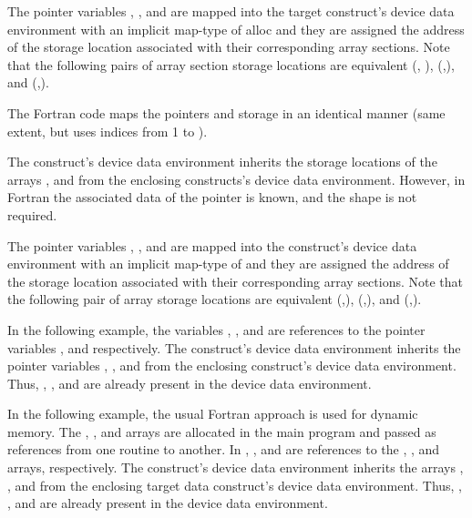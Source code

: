 The pointer variables , , and  are mapped into the target construct's device 
data environment with an implicit map-type of alloc and they are assigned the address 
of the storage location associated with their corresponding array sections. Note 
that the following pairs of array section storage locations are equivalent (, 
), (,), and (,).


The Fortran code maps the pointers and storage in an identical manner (same extent, 
but uses indices from 1 to ).

The  construct's device data environment inherits the storage locations 
of the arrays ,  and  from the enclosing   constructs's 
device data environment. However, in Fortran the associated data of the pointer 
is known, and the shape is not required.

The pointer variables , , and  are mapped into the  construct's 
device data environment with an implicit map-type of  and they are 
assigned the address of the storage location associated with their corresponding 
array sections. Note that the following pair of array storage locations are equivalent 
(,), (,), and (,).



In the following example, the variables , , and  are references to the pointer 
variables ,  and  respectively. The  construct's device data 
environment inherits the pointer variables , , and  from the enclosing  
 construct's device data environment. Thus, , , and  are already 
present in the device data environment.


In the following example, the usual Fortran approach is used for dynamic memory. 
The , , and  arrays are allocated in the main program and passed as references 
from one routine to another. In , ,  and  are references to the 
, , and  arrays, respectively. The  construct's device data 
environment inherits the arrays , , and  from the enclosing target data construct's 
device data environment. Thus, , , and  are already present in the device 
data environment.

